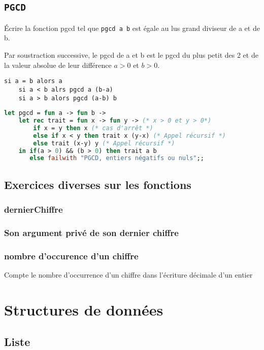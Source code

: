 \subsection{\texttt{PGCD}}
Écrire la fonction pgcd tel que \texttt{pgcd a b} est égale au lus grand diviseur de a et de b.

Par soustraction successive, le pgcd de a et b est le pgcd du plus petit des 2 et de la valeur absolue de leur différence $a>0$ et
$b>0$.
\begin{lstlisting}[language=algo, caption=Exercices -- Algorithme pgcd]
	si a = b alors a
	si a < b alrs pgcd a (b-a)
	si a > b alors pgcd (a-b) b
\end{lstlisting}

\begin{lstlisting}[language=Caml, caption=Exercice -- Fonction pgcd]
let pgcd = fun a -> fun b ->
	let rec trait = fun x -> fun y -> (* x > 0 et y > 0*)
		if x = y then x (* cas d'arrêt *)
		else if x < y then trait x (y-x) (* Appel récursif *)
		else trait (x-y) y (* Appel récursif *)
	in if(a > 0) && (b > 0) then trait a b
	   else failwith "PGCD, entiers négatifs ou nuls";;
\end{lstlisting}

\subsection{Exercices diverses sur les fonctions}
\subsubsection{dernierChiffre}
\subsubsection{Son argument privé de son dernier chiffre}
\subsubsection{nombre d'occurence d'un chiffre}
Compte le nombre d'occurrence d'un chiffre dans l'écriture décimale d'un entier
\section{Structures de données}
\subsection{Liste}



